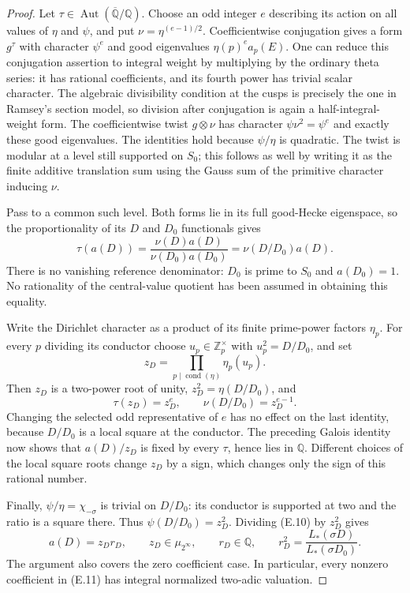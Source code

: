 \documentclass[11pt]{article}
\theoremstyle{definition}
\theoremstyle{remark}
\newcommand{\Q}{\mathbb Q}
\newcommand{\Z}{\mathbb Z}
\begin{document}
\begin{proof}
Let $\tau\in\operatorname{Aut}(\overline{\Q}/\Q)$.
Choose an odd integer $e$ describing its action on all values of
$\eta$ and $\psi$, and put $\nu=\eta^{(e-1)/2}$.
Coefficientwise conjugation gives a form $g^\tau$ with character
$\psi^e$ and good eigenvalues $\eta(p)^e a_p(E)$.
One can reduce this conjugation assertion to integral weight by
multiplying by the ordinary theta series: it has rational
coefficients, and its fourth power has trivial scalar character.
The algebraic divisibility condition at the cusps is precisely the
one in Ramsey's section model, so division after conjugation is
again a half-integral-weight form.
The coefficientwise twist $g\otimes\nu$ has character
$\psi\nu^2=\psi^e$ and exactly these good eigenvalues.
The identities hold because $\psi/\eta$ is quadratic.
The twist is modular at a level still supported on $S_0$; this
follows as well by writing it as the finite additive translation
sum using the Gauss sum of the primitive character inducing $\nu$.

Pass to a common such level. Both forms lie in its full
good-Hecke eigenspace, so the proportionality of its $D$ and $D_0$
functionals gives
\[
 \tau(a(D))
 =\frac{\nu(D)a(D)}{\nu(D_0)a(D_0)}
 =\nu(D/D_0)a(D).                                  
\]
There is no vanishing reference denominator: $D_0$ is prime to
$S_0$ and $a(D_0)=1$. No rationality of the central-value quotient
has been assumed in obtaining this equality.

Write the Dirichlet character as a product of its finite
prime-power factors $\eta_p$. For every $p$ dividing its conductor
choose $u_p\in\Z_p^\times$ with $u_p^2=D/D_0$, and set
\[
                 z_D=\prod_{p\mid\operatorname{cond}(\eta)}
                                      \eta_p(u_p).
\]
Then $z_D$ is a two-power root of unity,
$z_D^2=\eta(D/D_0)$, and
\[
 \tau(z_D)=z_D^e,\qquad
 \nu(D/D_0)=z_D^{e-1}.
\]
Changing the selected odd representative of $e$ has no effect on
the last identity, because $D/D_0$ is a local square at the
conductor. The preceding Galois identity now shows that $a(D)/z_D$ is fixed by
every $\tau$, hence lies in $\Q$.
Different choices of the local square roots change $z_D$ by a
sign, which changes only the sign of this rational number.

Finally, $\psi/\eta=\chi_{-\sigma}$ is trivial on $D/D_0$:
its conductor is supported at two and the ratio is a square there.
Thus $\psi(D/D_0)=z_D^2$. Dividing (E.10) by $z_D^2$ gives
\[
 a(D)=z_Dr_D,\qquad z_D\in\mu_{2^\infty},\qquad r_D\in\Q,
 \qquad r_D^2=\frac{L_*(\sigma D)}{L_*(\sigma D_0)}.       \tag{E.11}
\]
The argument also covers the zero coefficient case. In particular,
every nonzero coefficient in (E.11) has integral normalized
two-adic valuation.


\end{proof}
\end{document}
